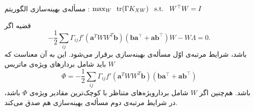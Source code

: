\begin{rawslide}
	مسأله‌ی بهینه‌سازی الگوریتم
	\large{}\normalsize:\hfill
	$\max_W \;\; \mathrm{tr}(\Gamma K_{XW})\;\;\;\mathrm{s.t.}\;\;\;W^\top W=I$
	\begin{block}{قضیه}
		اگر
		\[-\frac{1}{2}\sum_{ij}{\Gamma_{ij} f'(\mathbf{a}^{T}WW^{T}\mathbf{b})} (\mathbf{b}\mathbf{a}^\top  + \mathbf{a}\mathbf{b}^\top )W - W \Lambda = 0.\]
		باشد، شرایط مرتبه‌ی اوّل مسأله‌ی بهینه‌سازی
		\large{}\normalsize
		برقرار می‌شود.
		این به آن معناست که 
		$W$
		باید شامل بردارهای ویژه‌ی ماتریس
		\[\Phi= -\frac{1}{2}\sum_{ij}{\Gamma_{ij} f'(\mathbf{a}^{T}WW^{T}\mathbf{b})} (\mathbf{b}\mathbf{a}^\top  + \mathbf{a}\mathbf{b}^\top )\]
		باشد. هم‌چنین اگر 
		$W$
		شامل بردارویژه‌های متناظر با کوچک‌ترین مقادیر ویژه‌ی 
		$\Phi$
		باشد، در شرایط مرتبه‌ی دوم مسأله‌ی بهینه‌سازی
		\large{}\normalsize
		هم صدق می‌کند.
		
	\end{block}
\end{rawslide}
